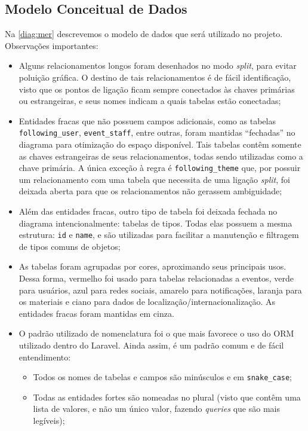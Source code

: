 \documentclass[12pt,a4paper,twoside,hyphens,english,brazil]{abntex2}
\begin{document}
{%
\subsection{Modelo Conceitual de Dados} \label{sec:mer}
Na \autoref{diag:mer} descrevemos o modelo de dados que será utilizado no projeto. Observações importantes:
\begin{itemize}
	\item Alguns relacionamentos longos foram desenhados no modo \emph{split}, para evitar poluição gráfica. O destino de tais relacionamentos é de fácil identificação, visto que os pontos de ligação ficam sempre conectados às chaves primárias ou estrangeiras, e seus nomes indicam a quais tabelas estão conectadas;
	\item Entidades fracas que não possuem campos adicionais, como as tabelas \texttt{following\_user}, \texttt{event\_staff}, entre outras, foram mantidas ``fechadas'' no diagrama para otimização do espaço disponível. Tais tabelas contêm somente as chaves estrangeiras de seus relacionamentos, todas sendo utilizadas como a chave primária. A única exceção à regra é \texttt{following\_theme} que, por possuir um relacionamento com uma tabela que necessita de uma ligação \emph{split}, foi deixada aberta para que os relacionamentos não gerassem ambiguidade;
	\item Além das entidades fracas, outro tipo de tabela foi deixada fechada no diagrama intencionalmente: tabelas de tipos. Todas elas possuem a mesma estrutura: \texttt{id} e \texttt{name}, e são utilizadas para facilitar a manutenção e filtragem de tipos comuns de objetos;
	\item As tabelas foram agrupadas por cores, aproximando seus principais usos. Dessa forma, vermelho foi usado para tabelas relacionadas a eventos, verde para usuários, azul para redes sociais, amarelo para notificações, laranja para os materiais e ciano para dados de localização/internacionalização. As entidades fracas foram mantidas em cinza.
	\item O padrão utilizado de nomenclatura foi o que mais favorece o uso do ORM utilizado dentro do Laravel. Ainda assim, é um padrão comum e de fácil entendimento:
		\begin{itemize}
			\item Todos os nomes de tabelas e campos são minúsculos e em \texttt{snake\_case};
			\item Todas as entidades fortes são nomeadas no plural (visto que contêm uma lista de valores, e não um único valor, fazendo \emph{queries} que são mais legíveis);

\end{itemize}
\end{itemize}}
\end{document}

